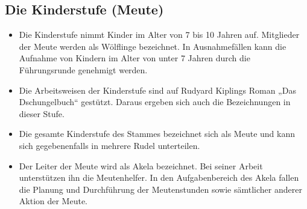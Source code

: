 \documentclass[a4paper]{article}
\begin{document}
    \subsection{Die Kinderstufe (Meute)} %
    \label{sub:die_kinderstufe_meute}
		\begin{itemize}
			\item Die Kinderstufe nimmt Kinder im Alter von 7 bis 10 Jahren auf. Mitglieder der Meute werden als Wölflinge bezeichnet. In Ausnahmefällen kann die Aufnahme von Kindern im Alter von unter 7 Jahren durch die Führungsrunde genehmigt werden. 
			\item Die Arbeitsweisen der Kinderstufe sind auf Rudyard Kiplings Roman „Das Dschungelbuch“ gestützt. Daraus ergeben sich auch die Bezeichnungen in dieser Stufe. 
			\item Die gesamte Kinderstufe des Stammes bezeichnet sich als Meute und kann sich gegebenenfalls in mehrere Rudel unterteilen. 
			\item Der Leiter der Meute wird als Akela bezeichnet. Bei seiner Arbeit unterstützen ihn die Meutenhelfer. In den Aufgabenbereich des Akela fallen die Planung und Durchführung der Meutenstunden sowie sämtlicher anderer Aktion der Meute. 
		\end{itemize}
\end{document}
